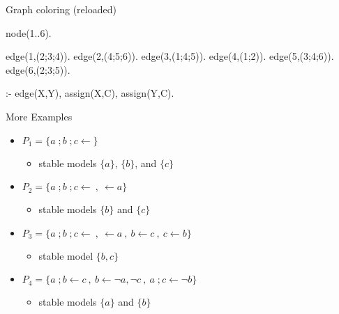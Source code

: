 \begin{frame}[fragile]{Graph coloring (reloaded)}
  \begin{semiverbatim}
    node(1..6).

    edge(1,(2;3;4)).  edge(2,(4;5;6)).  edge(3,(1;4;5)).
    edge(4,(1;2)).    edge(5,(3;4;6)).  edge(6,(2;3;5)).


    :- edge(X,Y), assign(X,C), assign(Y,C).
  \end{semiverbatim}
\end{frame}
\begin{frame}{More Examples}
  \bigskip
  \begin{itemize}\itemsep 2ex
    \item<1-2,9>
          \(
          P_1=\{a\;;b\;;c\leftarrow\}
          \)
          \begin{itemize}
            \item<2,9> stable models $\{a\}$, $\{b\}$, and $\{c\}$
          \end{itemize}
    \item<3-4,9>
          \(
          P_2=\{a\;;b\;;c\leftarrow \ ,\ \leftarrow a\}
          \)
          \begin{itemize}
            \item<4,9> stable models $\{b\}$ and $\{c\}$\pause
          \end{itemize}
    \item<5-6,9>
          \(
          P_3=\{a\;;b\;;c\leftarrow \ ,\ \leftarrow a\ ,\ b \leftarrow c\ ,\ c \leftarrow b  \}
          \)
          \begin{itemize}
            \item<6,9> stable model $\{b,c\}$
          \end{itemize}
    \item<7-8,9>
          \(
          P_4=\{a\;;b\leftarrow c\ ,\ b \leftarrow {\neg a}, {\neg c}\ ,\ a\;;c \leftarrow {\neg b}  \}
          \)
          \begin{itemize}
            \item<8,9> stable models $\{a\}$ and $\{b\}$
          \end{itemize}
  \end{itemize}
\end{frame}
